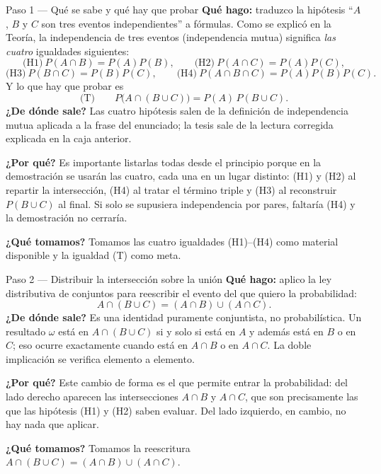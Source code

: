 \documentclass[11pt]{article}
\begin{document}
\begin{sol}
\begin{paso}{Paso 1 --- Qué se sabe y qué hay que probar}
\textbf{Qué hago:} traduzco la hipótesis ``$A$, $B$ y $C$ son tres eventos independientes'' a
fórmulas. Como se explicó en la Teoría, la independencia de tres eventos (independencia mutua)
significa \emph{las cuatro} igualdades siguientes:
\[
\text{(H1)}\ P(A\cap B)=P(A)P(B),\qquad
\text{(H2)}\ P(A\cap C)=P(A)P(C),
\]
\[
\text{(H3)}\ P(B\cap C)=P(B)P(C),\qquad
\text{(H4)}\ P(A\cap B\cap C)=P(A)P(B)P(C).
\]
Y lo que hay que probar es
\[
\text{(T)}\qquad P\bigl(A\cap(B\cup C)\bigr)=P(A)\,P(B\cup C).
\]
\textbf{¿De dónde sale?} Las cuatro hipótesis salen de la definición de independencia mutua
aplicada a la frase del enunciado; la tesis sale de la lectura corregida explicada en la caja
anterior.

\textbf{¿Por qué?} Es importante listarlas todas desde el principio porque en la demostración
se usarán las cuatro, cada una en un lugar distinto: (H1) y (H2) al repartir la intersección,
(H4) al tratar el término triple y (H3) al reconstruir $P(B\cup C)$ al final. Si solo se
supusiera independencia por pares, faltaría (H4) y la demostración no cerraría.

\textbf{¿Qué tomamos?} Tomamos las cuatro igualdades (H1)--(H4) como material disponible y la
igualdad (T) como meta.
\end{paso}

\begin{paso}{Paso 2 --- Distribuir la intersección sobre la unión}
\textbf{Qué hago:} aplico la ley distributiva de conjuntos para reescribir el evento del que
quiero la probabilidad:
\[
A\cap(B\cup C)=(A\cap B)\cup(A\cap C).
\]
\textbf{¿De dónde sale?} Es una identidad puramente conjuntista, no probabilística. Un
resultado $\omega$ está en $A\cap(B\cup C)$ si y solo si está en $A$ y además está en $B$ o en
$C$; eso ocurre exactamente cuando está en $A\cap B$ o en $A\cap C$. La doble implicación se
verifica elemento a elemento.

\textbf{¿Por qué?} Este cambio de forma es el que permite entrar la probabilidad: del lado
derecho aparecen las intersecciones $A\cap B$ y $A\cap C$, que son precisamente las que las
hipótesis (H1) y (H2) saben evaluar. Del lado izquierdo, en cambio, no hay nada que aplicar.

\textbf{¿Qué tomamos?} Tomamos la reescritura
$A\cap(B\cup C)=(A\cap B)\cup(A\cap C)$.
\end{paso}


\end{sol}
\end{document}
